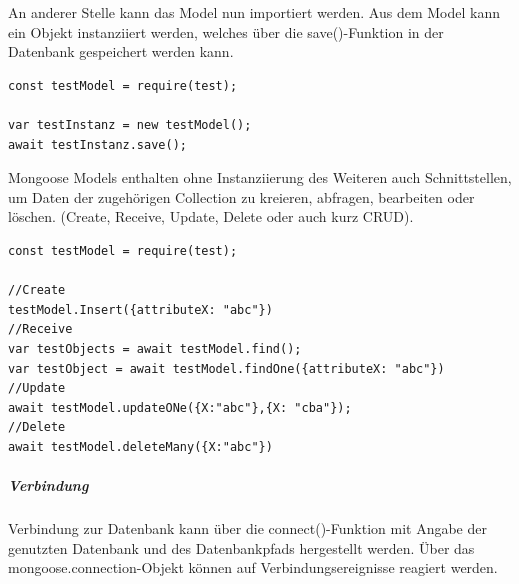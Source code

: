 
An anderer Stelle kann das Model nun importiert werden. Aus dem Model kann ein Objekt instanziiert werden, welches über die save()-Funktion in der Datenbank gespeichert werden kann.

\begin{lstlisting}[caption=Model importieren - Objekt instanziieren und persistent speichern,label=lst:MongooseObjectInstance]
const testModel = require(test);

var testInstanz = new testModel();
await testInstanz.save();
\end{lstlisting}


Mongoose Models enthalten ohne Instanziierung des Weiteren auch Schnittstellen, um Daten der zugehörigen Collection zu kreieren, abfragen, bearbeiten oder löschen. (Create, Receive, Update, Delete oder auch kurz CRUD).
\newline


\begin{lstlisting}[caption=CRUD-Beispielfunktionen eines Mongoose-Models,label=lst:MongooseCrud]
const testModel = require(test);

//Create
testModel.Insert({attributeX: "abc"})
//Receive
var testObjects = await testModel.find();
var testObject = await testModel.findOne({attributeX: "abc"})
//Update
await testModel.updateONe({X:"abc"},{X: "cba"});
//Delete
await testModel.deleteMany({X:"abc"})
\end{lstlisting}


\newpage
\subparagraph{Verbindung}
Verbindung zur Datenbank kann über die connect()-Funktion mit Angabe der genutzten Datenbank und des Datenbankpfads hergestellt werden. 
Über das mongoose.connection-Objekt können auf Verbindungsereignisse reagiert werden. 
\newline

